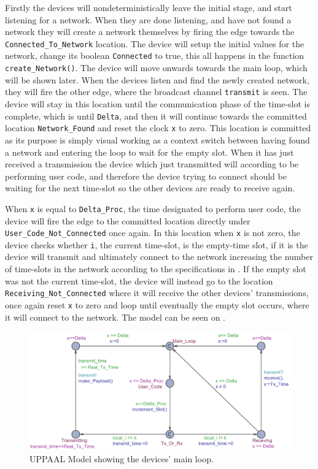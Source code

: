 \newpage
\noindent
Firstly the devices will nondeterministically leave the initial stage, and start listening for a network.
When they are done listening, and have not found a network they will create a network themselves by firing the edge towards the \texttt{Connected\_To\_Network} location.
The device will setup the initial values for the network, change its boolean \texttt{Connected} to true, this all happens in the function \texttt{create\_Network()}. 
The device will move onwards towards the main loop, which will be shown later.
When the devices listen and find the newly created network, they will fire the other edge, where the broadcast channel \texttt{transmit} is seen.
The device will stay in this location until the communication phase of the time-slot is complete, which is until \texttt{Delta}, and then it will continue towards the committed location \texttt{Network\_Found} and reset the clock \texttt{x} to zero.
This location is committed as its purpose is simply visual working as a context switch between having found a network and entering the loop to wait for the empty slot.
When it has just received a transmission the device which just transmitted will according to  be performing user code, and therefore the device trying to connect should be waiting for the next time-slot so the other devices are ready to receive again.

\bigskip \noindent
When \texttt{x} is equal to \texttt{Delta\_Proc}, the time designated to perform user code, the device will fire the edge to the committed location directly under \texttt{User\_Code\_Not\_Connected} once again.
In this location when \texttt{x} is not zero, the device checks whether \texttt{i}, the current time-slot, is the empty-time slot, if it is the device will transmit and ultimately connect to the network increasing the number of time-slots in the network according to the specifications in .
If the empty slot was not the current time-slot, the device will instead go to the location \texttt{Receiving\_Not\_Connected} where it will receive the other devices' transmissions, once again reset \texttt{x} to zero and loop until eventually the empty slot occurs, where it will connect to the network.
The model can be seen on .

\begin{figure}
  \includegraphics[width=1\textwidth]{Figures/Model/Device_Connected.pdf} 
\caption{UPPAAL Model showing the devices' main loop.}
\label{fig:UPPAAL_Connected}
\end{figure}

